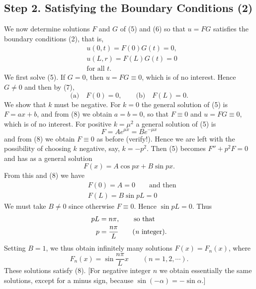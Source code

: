 \documentclass[twocolumn, 12pt, leqno, oneside]{amsart}
\begin{document}
\subsection{Step 2. Satisfying the Boundary Conditions (2)}

We now determine solutions $F$ and $G$ of (5) and (6) so that $u=FG$ satisfies 
the boundary conditions (2), that is,
\begin{equation}
  \begin{split}
      & u(0,t)=F(0)G(t) =0, \\
      & u(L,r)=F(L)G(t) =0 \\
      & \text{for all }t.
  \end{split}
\end{equation}
We first solve (5). If $G=0$, then $u=FG\equiv0$, which is of no interest. 
Hence $G\neq0$ and then by (7),
\begin{equation}
    \text{(a)} \quad F(0)=0, \qquad \text{(b)} \quad F(L)=0.
\end{equation}
We show that $k$ must be negative. For $k=0$ the general solution of (5) is
$F=ax+b$, and from (8) we obtain $a=b=0$, so that $F\equiv0$ and 
$u=FG\equiv0$, which is of no interest. For positive $k=\mu^2$ a general 
solution of (5) is
\begin{equation}
  \nonumber
    F=Ae^{\mu x} = Be^{-\mu x}
\end{equation}
and from (8) we obtain $F\equiv0$ as before (verify!). Hence we are left with 
the possibility of choosing $k$ negative, say, $k=-p^2$. Then (5) becomes 
$F''+p^2F=0$ and has as a general solution
\begin{equation}
  \nonumber
    F(x)=A\cos{px} + B\sin{px}.
\end{equation}
From this and (8) we have
\begin{equation}
  \nonumber
  \begin{split}
      & F(0)=A=0 \qquad \text{and then} \\ 
      & F(L)=B\sin{pL}=0
  \end{split}
\end{equation}
We must take $B\neq0$ since otherwise $F\equiv0$. Hence $\sin{pL}=0$. Thus
\begin{equation}
  \begin{split}
      pL&=n\pi, \qquad \text{so that} \\
      p&=\frac{n\pi}{L} \qquad \text{(\emph{n} integer)}.
  \end{split}
\end{equation}
Setting $B=1$, we thus obtain infinitely many solutions $F(x)=F_n(x)$, where
\begin{equation}
    F_n(x)=\sin{ \frac{n\pi}{L} x} \quad \quad (n=1,2,\dotsb).
\end{equation}
These solutions satisfy (8). [For negative integer $n$ we obtain essentially 
the same solutions, except for a minus sign, because 
$\sin{(-\alpha)}=-\sin{\alpha}$.]
\end{document}
